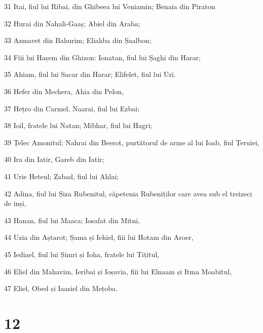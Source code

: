 \par 31 Itai, fiul lui Ribai, din Ghibeea lui Veniamin; Benaia din Piraton
\par 32 Hurai din Nahali-Gaaș; Abiel din Araba;
\par 33 Azmavet din Bahurim; Eliahba din Șaalbon;
\par 34 Fiii lui Hașem din Ghizon: Ionatan, fiul lui Șaghi din Harar;
\par 35 Ahiam, fiul lui Sacar din Harar; Elifelet, fiul lui Uri.
\par 36 Hefer din Mechera, Ahia din Pelon,
\par 37 Hețro din Carmel, Naarai, fiul lui Ezbai;
\par 38 Ioil, fratele lui Natan; Mibhar, fiul lui Hagri;
\par 39 Țelec Amonitul; Nahrai din Beerot, purtătorul de arme al lui Ioab, fiul Țeruiei,
\par 40 Ira din Iatir, Gareb din Iatir;
\par 41 Urie Heteul; Zabad, fiul lui Ahlai;
\par 42 Adina, fiul lui Șiza Rubenitul, căpetenia Rubeniților care avea sub el treizeci de inși,
\par 43 Hanan, fiul lui Maaca; Iosafat din Mitni,
\par 44 Uzia din Aștarot; Șama și Iehiel, fiii lui Hotam din Aroer,
\par 45 Iediael, fiul lui Șimri și Ioha, fratele lui Tițitul,
\par 46 Eliel din Mahavim, Ieribai și Ioșavia, fiii lui Elnaam și Itma Moabitul,
\par 47 Eliel, Obed și Iaasiel din Mețoba.

\chapter{12}

